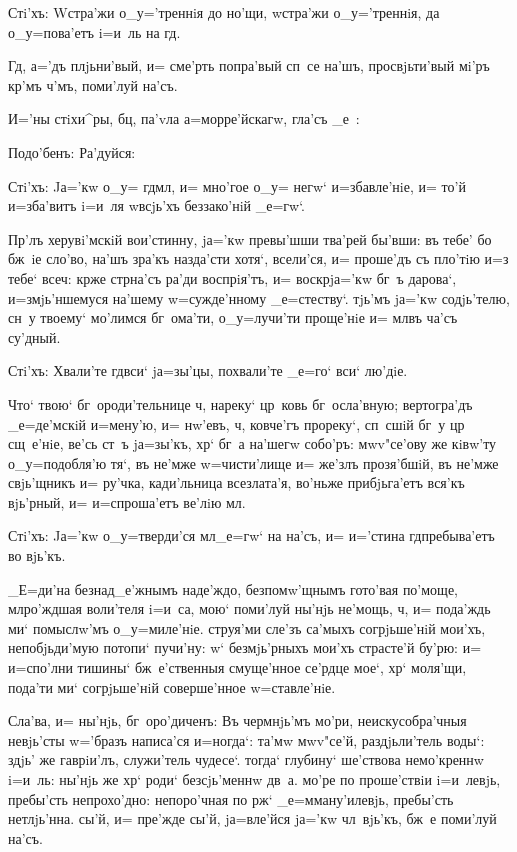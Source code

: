 Стi'хъ: W\т стра'жи о_у='треннiя до но'щи, w\т стра'жи 
о_у='треннiя, да о_у=пова'етъ i=и~ль на гд.

Гд, а='дъ плjьни'вый, и= сме'рть попра'вый сп~се 
на'шъ, просвjьти'вый мi'ръ кр'мъ ч'мъ, поми'луй 
на'съ. 

И='ны стiхи^ры, бц, па'vла а=морре'йскагw, гла'съ 
_е~:

Подо'бенъ: Ра'дуйся:

Стi'хъ: Jа='кw о_у= гд мл, и= мно'гое о_у= 
негw` и=збавле'нiе, и= то'й и=зба'витъ i=и~ля w\т всjь'хъ 
беззако'нiй _е=гw`.

Пр'лъ херувi'мскiй вои'стинну, jа='кw превы'шши 
тва'рей бы'вши: въ тебе' бо бж~iе сло'во, на'шъ зра'къ 
назда'сти хотя`, всели'ся, и= проше'дъ съ пло'тiю и=з\ъ 
тебе` всеч: кр же стр на'съ ра'ди 
воспрiя'тъ, и= воскр jа='кw бг~ъ дарова`, 
и=змjь'ншемуся на'шему w=сужде'нному _е=стеству`. тjь'мъ 
jа='кw содjь'телю, сн~у твоему` мо'лимся бг~ома'ти, 
о_у=лучи'ти проще'нiе и= мл въ ча'съ су'дный. 

Стi'хъ: Хвали'те гд вси` jа=зы'цы, похвали'те 
_е=го` вси` лю'дiе. 

Что` твою` бг~ороди'тельнице ч, нареку` цр~ковь 
бг~осла'вную; вертогра'дъ _е=де'мскiй и=мену'ю, и= 
нw'евъ, ч, ковче'гъ прореку`, сп~сшiй бг~у цр 
сщ~е'нiе, ве'сь ст~ъ jа=зы'къ, хр` бг~а на'шегw 
собо'ръ: мwv"се'ову же кiвw'ту о_у=подобля'ю тя`, въ 
не'мже w=чисти'лище и= же'злъ прозя'бшiй, въ не'мже 
свjь'щникъ и= ру'чка, кади'льница всезлата'я, во'ньже 
прибjьга'етъ вся'къ вjь'рный, и= и=спроша'етъ ве'лiю 
мл.

Стi'хъ: Jа='кw о_у=тверди'ся мл _е=гw` на на'съ, 
и= и='стина гд пребыва'етъ во вjь'къ.

_Е=ди'на безнад_е'жнымъ наде'ждо, безпомw'щнымъ 
гото'вая по'моще, мл ро'ждшая воли'теля i=и~са, мою` 
поми'луй ны'нjь не'мощь, ч, и= пода'ждь ми` 
помыслw'мъ о_у=миле'нiе. струя'ми сле'зъ са'мыхъ 
согрjьше'нiй мои'хъ, непобjьди'мую потопи` пучи'ну: 
w` безмjь'рныхъ мои'хъ страсте'й бу'рю: и= 
и=спо'лни тишины` бж~е'ственныя смуще'нное се'рдце мое`, 
хр` моля'щи, пода'ти ми` согрjьше'нiй соверше'нное 
w=ставле'нiе.

Сла'ва, и= ны'нjь, бг~оро'диченъ: Въ чермнjь'мъ мо'ри, 
неискусобра'чныя невjь'сты w='бразъ написа'ся и=ногда`: 
та'мw мwv"се'й, раздjьли'тель воды`: здjь' же гаврiи'лъ, 
служи'тель чудесе`. тогда` глубину` ше'ствова немо'креннw 
i=и~ль: ны'нjь же хр` роди` безсjь'меннw дв~а. мо'ре 
по проше'ствiи i=и~левjь, пребы'сть непрохо'дно: 
непоро'чная по рж` _е=мману'илевjь, пребы'сть 
нетлjь'нна. сы'й, и= пре'жде сы'й, jа=вле'йся jа='кw 
чл~вjь'къ, бж~е поми'луй на'съ.


